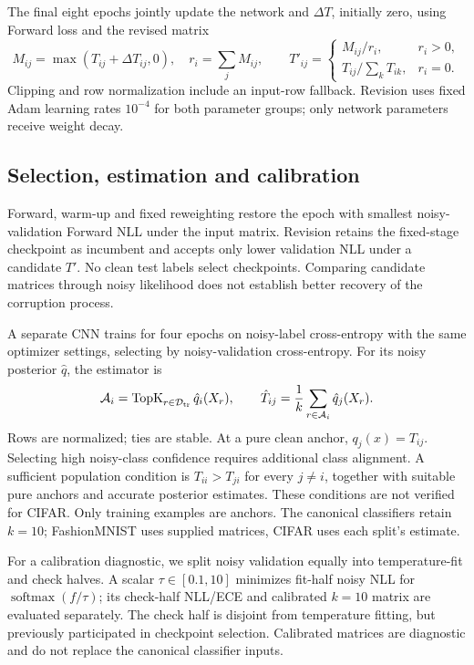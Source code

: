 \documentclass[12pt]{article}
\begin{document}
\noindent\begin{minipage}{\linewidth}
The final eight epochs jointly update the network and $\Delta T$, initially zero, using Forward loss and the revised matrix
\begin{equation}
M_{ij}=\max(T_{ij}+\Delta T_{ij},0),\quad r_i=\sum_jM_{ij},\qquad
T'_{ij}=\begin{cases}M_{ij}/r_i,&r_i>0,\\T_{ij}/\sum_kT_{ik},&r_i=0.\end{cases}
\label{eq:revision}
\end{equation}
Clipping and row normalization include an input-row fallback. Revision uses fixed Adam learning rates $10^{-4}$ for both parameter groups; only network parameters receive weight decay.
\end{minipage}

\subsection{Selection, estimation and calibration}
Forward, warm-up and fixed reweighting restore the epoch with smallest noisy-validation Forward NLL under the input matrix. Revision retains the fixed-stage checkpoint as incumbent and accepts only lower validation NLL under a candidate $T'$. No clean test labels select checkpoints. Comparing candidate matrices through noisy likelihood does not establish better recovery of the corruption process.

A separate CNN trains for four epochs on noisy-label cross-entropy with the same optimizer settings, selecting by noisy-validation cross-entropy. For its noisy posterior $\hat q$, the estimator is
\begin{equation}
\mathcal A_i=\operatorname{TopK}_{r\in\mathcal D_{\rm tr}}\hat q_i(X_r),\qquad
\hat T_{ij}=\frac1k\sum_{r\in\mathcal A_i}\hat q_j(X_r).
\label{eq:anchor}
\end{equation}
Rows are normalized; ties are stable. At a pure clean anchor, $q_j(x)=T_{ij}$. Selecting high noisy-class confidence requires additional class alignment. A sufficient population condition is $T_{ii}>T_{ji}$ for every $j\ne i$, together with suitable pure anchors and accurate posterior estimates. These conditions are not verified for CIFAR. Only training examples are anchors. The canonical classifiers retain $k=10$; FashionMNIST uses supplied matrices, CIFAR uses each split's estimate.

For a calibration diagnostic, we split noisy validation equally into temperature-fit and check halves. A scalar $\tau\in[0.1,10]$ minimizes fit-half noisy NLL for $\operatorname{softmax}(f/\tau)$; its check-half NLL/ECE and calibrated $k=10$ matrix are evaluated separately. The check half is disjoint from temperature fitting, but previously participated in checkpoint selection. Calibrated matrices are diagnostic and do not replace the canonical classifier inputs.
\end{document}
